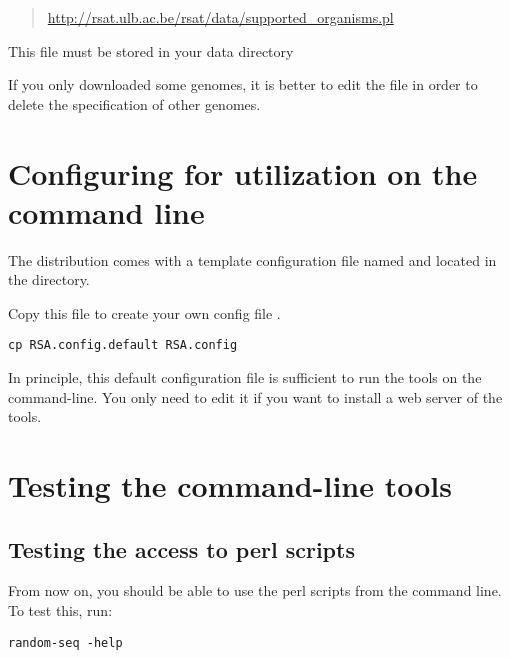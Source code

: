 \documentclass{article}
\begin{document}
\begin{quote}
\url{http://rsat.ulb.ac.be/rsat/data/supported\_organisms.pl}
\end{quote}

This file must be stored in your \RSAT data directory

\begin{quote}
\end{quote}

If you only downloaded some genomes, it is better to edit the file
 in order to delete the specification of
other genomes. 

\section{Configuring \RSAT for utilization on the command line}

The \RSAT distribution comes with a template configuration file named
 and located in the 
directory.

Copy this file to create your own config file .

\begin{verbatim}
cp RSA.config.default RSA.config
\end{verbatim}

In principle, this default configuration file is sufficient to run the
tools on the command-line. You only need to edit it if you want to
install a web server of the tools.


\section{Testing the command-line tools}

\subsection{Testing the access to perl scripts}

From now on, you should be able to use the perl scripts from the
command line. To test this, run: 

\begin{verbatim}
random-seq -help
\end{verbatim}
\end{document}
